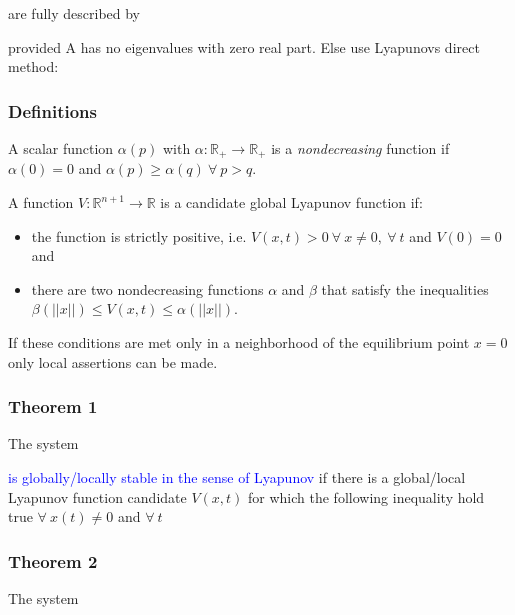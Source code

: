 \documentclass[10pt,a4paper]{scrartcl}
\begin{document}
\begin{multicols*}{3}

are fully described by


provided A has no eigenvalues with zero real part. Else use Lyapunovs direct method:

\subsubsection{Definitions}

A scalar function $\alpha(p)$ with $\alpha:\mathbb{R}_+\rightarrow\mathbb{R}_+$ is a \emph{nondecreasing} function if $\alpha(0)=0$ and $\alpha(p)\geq\alpha(q)\ \forall\ p>q$.

A function $V:\mathbb{R}^{n+1}\rightarrow \mathbb{R}$ is a candidate global Lyapunov function if:

\begin{itemize}
\ncompaq
\item the function is strictly positive, i.e. $V(x,t)>0\ \forall\ x\neq 0,\ \forall\ t$ and $V(0) = 0$ and
\item there are two nondecreasing functions $\alpha$ and $\beta$ that satisfy the inequalities $\beta(||x||)\leq V(x,t)\leq\alpha(||x||)$.
\end{itemize}

If these conditions are met only in a neighborhood of the equilibrium point $x=0$ only local assertions can be made.

\subsubsection{Theorem 1}
The system


\textcolor{blue}{is globally/locally stable in the sense of Lyapunov} if there is a global/local Lyapunov function candidate $V(x,t)$ for which the following inequality hold true $\forall\ x(t)\neq 0$ and $\forall\ t$


\subsubsection{Theorem 2}

The system


\end{multicols*}
\end{document}
